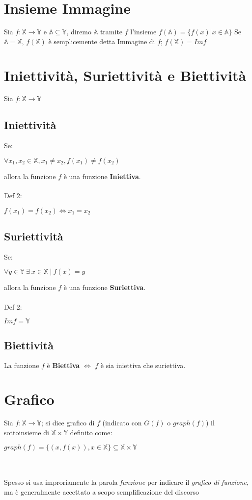 \section{Insieme Immagine}
Sia $f: \mathbb{X} \rightarrow \mathbb{Y}$ e $\mathbb{A} \subseteq \mathbb{Y}$, diremo $\mathbb{A}$ tramite $f$ l'insieme $f(\mathbb{A}) = \{f(x) | x \in \mathbb{A}\}$
Se $\mathbb{A} = \mathbb{X}$, $f(\mathbb{X})$ è semplicemente detta Immagine di $f$; $f(\mathbb{X}) = Imf$

\section{Iniettività, Suriettività e Biettività}
Sia $f: \mathbb{X} \rightarrow \mathbb{Y}$
\subsection{Iniettività}
Se: \begin{Large}
$\forall x_1,x_2 \in \mathbb{X}, x_1 \neq x_2, f(x_1) \neq f(x_2)$ 
\end{Large} 
allora la funzione $f$ è una funzione \textbf{Iniettiva}.\\
\\
Def 2:\\
\begin{Large}
$f(x_1) = f(x_2) \iff x_1=x_2$ 
\end{Large}

\subsection{Suriettività}
Se: \begin{Large}
$\forall y \in \mathbb{Y}\ \exists\ x \in \mathbb{X}\ |\ f(x) = y$ 
\end{Large} 
allora la funzione $f$ è una funzione \textbf{Suriettiva}.\\
\\
Def 2:\\
\begin{Large}
$Imf = \mathbb{Y}$ 
\end{Large}

\subsection{Biettività}
La funzione $f$ è \textbf{Biettiva} $\iff$ $f$ è sia iniettiva che suriettiva.

\section{Grafico}
Sia $f: \mathbb{X} \rightarrow \mathbb{Y}$; si dice grafico di $f$ (indicato con $G(f)$ o $graph(f)$) il sottoinsieme di $\mathbb{X}\times\mathbb{Y}$ definito come:\\
\begin{Large}
$graph(f)=\{(x,f(x)), x \in \mathbb{X}\} \subseteq \mathbb{X}\times\mathbb{Y}$
\end{Large}\\
\\
Spesso si usa improriamente la parola \textit{funzione} per indicare il \textit{grafico di funzione}, ma è generalmente accettato a scopo semplificazione del discorso
